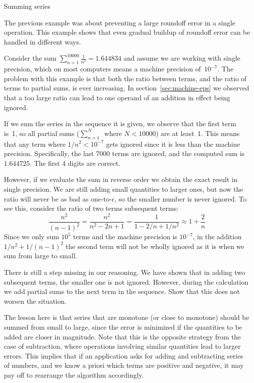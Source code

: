  {Summing series}
\label{sec:fp-summing}

The previous example was about preventing a large roundoff error in a
single operation. This example shows that even gradual buildup of
roundoff error can be handled in different ways.

Consider the sum $\sum_{n=1}^{10000}\frac{1}{n^2}=1.644834$
and assume we are working with single precision, which on most computers
means a machine precision of~$10^{-7}$. The problem with this example
is that both the ratio between terms, and the ratio of terms to
partial sums, is ever increasing. In section~\ref{sec:machine-eps} we
observed that a too large ratio can lead to one operand of an addition in
effect being ignored.

If we sum the series in the sequence it is given, we observe that
the first term is~1, so all partial sums ($\sum_{n=1}^N$~where $N<10000$)
are at least~1. This means that any term where $1/n^2<10^{-7}$ gets
ignored since it is less than the machine precision.
Specifically, the last 7000 terms are ignored, and
the computed sum is~$1.644725$. The first 4 digits are correct.

However, if we evaluate the sum in reverse order
we obtain the exact result in single precision. We are still adding
small quantities to larger ones, but now the ratio will never be as
bad as one-to-$\epsilon$, so the smaller number is never ignored.
To see this,
consider the ratio of two terms subsequent terms:
\[ \frac{n^2}{(n-1)^2}=\frac{n^2}{n^2-2n+1}=\frac1{1-2/n+1/n^2}
    \approx 1+\frac2n
\]
Since we only sum $10^5$ terms and the machine precision is $10^{-7}$, 
in the addition $1/n^2+1/(n-1)^2$ the second term will not be wholly
ignored as it is when we sum from large to small.
\begin{exercise}
  There is still a step missing in our reasoning. We have shown that
  in adding two subsequent terms, the smaller one is not
  ignored. However, during the calculation we add partial sums to the
  next term in the sequence. Show that this does not worsen the situation.
\end{exercise}

The lesson here is that series that are monotone (or close to
monotone) should be summed from small to large, since the error is
minimized if the quantities to be added are closer in magnitude. Note
that this is the opposite strategy from the case of subtraction, where
operations involving similar quantities lead to larger errors. This
implies that if an application asks for adding and subtracting series
of numbers, and we know a priori which terms are positive and
negative, it may pay off to rearrange the algorithm accordingly.

